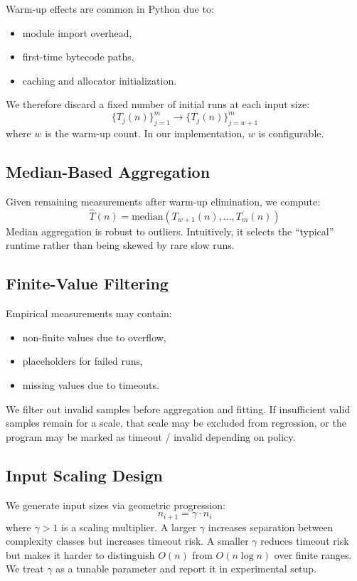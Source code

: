 \documentclass[conference]{IEEEtran}
\begin{document}
Warm-up effects are common in Python due to:
\begin{itemize}[leftmargin=1.2em]
\item module import overhead,
\item first-time bytecode paths,
\item caching and allocator initialization.
\end{itemize}
We therefore discard a fixed number of initial runs at each input size:
\[
\{T_j(n)\}_{j=1}^{m}
\rightarrow
\{T_j(n)\}_{j=w+1}^{m}
\]
where $w$ is the warm-up count.
In our implementation, $w$ is configurable.

\subsection{Median-Based Aggregation}

Given remaining measurements after warm-up elimination, we compute:
\[
\hat{T}(n) = \mathrm{median}(T_{w+1}(n), \dots, T_m(n))
\]
Median aggregation is robust to outliers.
Intuitively, it selects the ``typical'' runtime rather than being skewed by rare
slow runs.

\subsection{Finite-Value Filtering}

Empirical measurements may contain:
\begin{itemize}[leftmargin=1.2em]
\item non-finite values due to overflow,
\item placeholders for failed runs,
\item missing values due to timeouts.
\end{itemize}
We filter out invalid samples before aggregation and fitting.
If insufficient valid samples remain for a scale, that scale may be excluded
from regression, or the program may be marked as timeout / invalid depending on
policy.

\subsection{Input Scaling Design}

We generate input sizes via geometric progression:
\[
n_{i+1} = \gamma \cdot n_i
\]
where $\gamma > 1$ is a scaling multiplier.
A larger $\gamma$ increases separation between complexity classes but increases
timeout risk.
A smaller $\gamma$ reduces timeout risk but makes it harder to distinguish
$O(n)$ from $O(n \log n)$ over finite ranges.
We treat $\gamma$ as a tunable parameter and report it in experimental setup.
\end{document}
